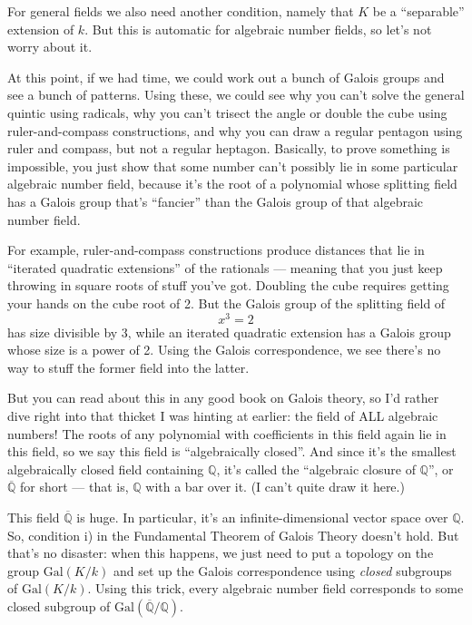 \documentclass{article}
\begin{document}
For general fields we also need another condition, namely that \(K\) be
a ``separable'' extension of \(k\). But this is automatic for algebraic
number fields, so let's not worry about it.

At this point, if we had time, we could work out a bunch of Galois
groups and see a bunch of patterns. Using these, we could see why you
can't solve the general quintic using radicals, why you can't trisect
the angle or double the cube using ruler-and-compass constructions, and
why you can draw a regular pentagon using ruler and compass, but not a
regular heptagon. Basically, to prove something is impossible, you just
show that some number can't possibly lie in some particular algebraic
number field, because it's the root of a polynomial whose splitting
field has a Galois group that's ``fancier'' than the Galois group of
that algebraic number field.

For example, ruler-and-compass constructions produce distances that lie
in ``iterated quadratic extensions'' of the rationals --- meaning that
you just keep throwing in square roots of stuff you've got. Doubling the
cube requires getting your hands on the cube root of 2. But the Galois
group of the splitting field of \[x^3 = 2\] has size divisible by 3,
while an iterated quadratic extension has a Galois group whose size is a
power of 2. Using the Galois correspondence, we see there's no way to
stuff the former field into the latter.

But you can read about this in any good book on Galois theory, so I'd
rather dive right into that thicket I was hinting at earlier: the field
of ALL algebraic numbers! The roots of any polynomial with coefficients
in this field again lie in this field, so we say this field is
``algebraically closed''. And since it's the smallest algebraically
closed field containing \(\mathbb{Q}\), it's called the ``algebraic
closure of \(\mathbb{Q}\)'', or \(\overline{\mathbb{Q}}\) for short ---
that is, \(\mathbb{Q}\) with a bar over it. (I can't quite draw it
here.)

This field \(\overline{\mathbb{Q}}\) is huge. In particular, it's an
infinite-dimensional vector space over \(\mathbb{Q}\). So, condition i)
in the Fundamental Theorem of Galois Theory doesn't hold. But that's no
disaster: when this happens, we just need to put a topology on the group
\(\mathrm{Gal}(K/k)\) and set up the Galois correspondence using
\emph{closed} subgroups of \(\mathrm{Gal}(K/k)\). Using this trick,
every algebraic number field corresponds to some closed subgroup of
\(\mathrm{Gal}(\overline{\mathbb{Q}}/\mathbb{Q})\).
\end{document}
